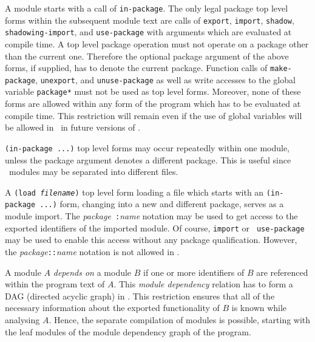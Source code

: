 A module starts with a call of {\tt in-package}. The only legal
package top level forms within the subsequent module text are calls of
{\tt export}, {\tt import}, {\tt shadow}, {\tt shadowing-import}, and
{\tt use-package} with arguments which are evaluated at compile time.
A top level package operation must not operate on a package other than
the current one. Therefore the optional package argument of the above
forms, if supplied, has to denote the current package. Function calls
of {\tt make-package}, {\tt unexport}, and {\tt unuse-package} as well
as write accesses to the global variable {\tt *package*} must
not be used as top level forms. Moreover, none of these forms
are allowed within any form of the
program which has to be evaluated at compile time. This restriction
will remain even if the use of global variables will be allowed in
\clm\ in future versions of . 


{\tt (in-package ...)} top level forms may occur repeatedly within one
module, unless the package argument denotes a different package.  This
is useful since \ modules may be separated into different files.

A {\tt (load {\it filename})} top level form loading a file which
starts with an {\tt (in-package ...)} form, changing into a new and
different package, serves as a module import. The {\em package}{\tt
:}{\em name} notation may be used to get access to the exported
identifiers of the imported module. Of course, {\tt import} or {\tt
use-package} may be used to enable this access without any package
qualification.  However, the {\em package}{\tt ::}{\em name} notation
is not allowed in .

A module $A$ {\em depends on} a module $B$ if one or more identifiers
of $B$ are referenced within the program text of $A$. This {\em module
dependency} relation has to form a DAG (directed acyclic graph) in
. This restriction ensures that all of the necessary information
about the exported functionality of $B$ is known while analysing $A$.
Hence, the separate compilation of modules is possible, starting with
the leaf modules of the module dependency graph of the program.


